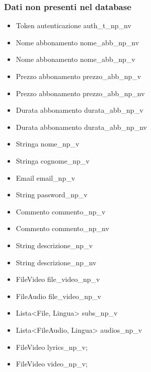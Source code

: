 \subsubsection{Dati non presenti nel database}
\begin{itemize}
    \item Token autenticazione auth\_t\_np\_nv
    \item Nome abbonamento nome\_abb\_np\_nv
    \item Nome abbonamento nome\_abb\_np\_v
    \item Prezzo abbonamento prezzo\_abb\_np\_v
    \item Prezzo abbonamento prezzo\_abb\_np\_nv
    \item Durata abbonamento durata\_abb\_np\_v
    \item Durata abbonamento durata\_abb\_np\_nv
    \item Stringa nome\_np\_v
    \item Stringa cognome\_np\_v
    \item Email email\_np\_v
    \item String password\_np\_v
    \item Commento commento\_np\_v
    \item Commento commento\_np\_nv
    \item String descrizione\_np\_v
    \item String descrizione\_np\_nv
    \item FileVideo file\_video\_np\_v
    \item FileAudio file\_video\_np\_v
    \item Lista<File, Lingua> subs\_np\_v
    \item Lista<FileAudio, Lingua> audios\_np\_v
    \item FileVideo lyrics\_np\_v;
    \item FileVideo video\_np\_v;

\end{itemize}

